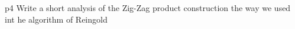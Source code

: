 \documentclass[a4paper, 11pt]{article}
\begin{document}

\begin{problem}{%
	}{p4%
	}
	Write a short analysis of the Zig-Zag product construction the way we used int he algorithm of Reingold
\end{problem}
\end{document}
